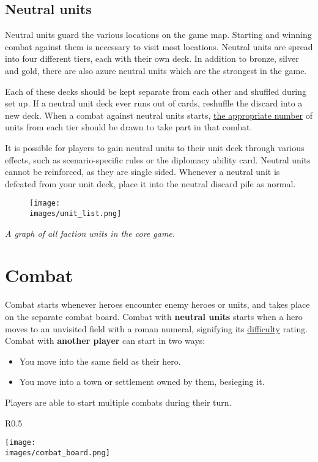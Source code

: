 \documentclass[12pt]{article}
\def\assets{assets}
\def\images{\assets/images}
\def\svgs{\assets/svgs}
\begin{document}
\subsection*{Neutral units}
Neutral units guard the various locations on the game map. Starting and winning combat against them is necessary to visit most locations. Neutral units are spread into four different tiers, each with their own deck. In addition to bronze, silver and gold, there are also azure  neutral units which are the strongest in the game.\par
Each of these decks should be kept separate from each other and shuffled during set up. If a neutral unit deck ever runs out of cards, reshuffle the discard into a new deck. When a combat against neutral units starts, \hyperlink{Difficulty}{the appropriate number} of units from each tier should be drawn to take part in that combat.\par
It is possible for players to gain neutral units to their unit deck through various effects, such as scenario-specific rules or the diplomacy ability card. Neutral units cannot be reinforced, as they are single sided. Whenever a neutral unit is defeated from your unit deck, place it into the neutral discard pile as normal.
\begin{figure}[h]
\centering
\texttt{[image: \\images/unit\_list.png]}
\end{figure}
\begin{center}
\textit{A graph of all faction units in the core game.}
\end{center}

\clearpage
\section[Combat]{Combat\hypertarget{Combat}{}}
Combat starts whenever heroes encounter enemy heroes or units, and takes place on the separate combat board. Combat with \textbf{neutral units} starts when a hero moves to an unvisited field with a roman numeral, signifying its \hyperlink{Difficulty}{difficulty} rating. Combat with \textbf{another player} can start in two ways:
\begin{itemize}
    \item You move into the same field as their hero.
    \item You move into a town or settlement owned by them, besieging it.
\end{itemize}
Players are able to start multiple combats during their turn.
\begin{wrapfigure}{R}{0.5\textwidth}
    \begin{center}
    \texttt{[image: \\images/combat\_board.png]}
    \end{center}
\end{wrapfigure}
\end{document}
